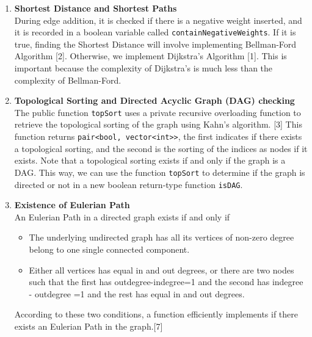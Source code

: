 \documentclass[a4paper,12pt]{article}
\def\code#1{\texttt{#1}}
\begin{document}
\begin{enumerate}
\item \textbf{Shortest Distance and Shortest Paths
\\}During edge addition, it is checked if there is a negative weight inserted, and it is recorded in a boolean variable called \code{containNegativeWeights}. If it is true, finding the Shortest Distance will involve implementing Bellman-Ford Algorithm [2]. Otherwise, we implement Dijkstra’s Algorithm [1]. This is important because the complexity of Dijkstra’s is much less than the complexity of Bellman-Ford.
\item \textbf{Topological Sorting and Directed Acyclic Graph (DAG) checking
\\}
The public function \code{topSort} uses a private recursive overloading function to retrieve the topological sorting of the graph using Kahn’s algorithm. [3] This function returns \code{pair<bool, vector<int>>}, the first indicates if there exists a topological sorting, and the second is the sorting of the indices as nodes if it exists. Note that a topological sorting exists if and only if the graph is a DAG. This way, we can use the function \code{topSort} to determine if the graph is directed or not in a new boolean return-type function \code{isDAG}.
\item \textbf{Existence of Eulerian Path\\}
An Eulerian Path in a directed graph exists if and only if 
\begin{itemize}
    \item The underlying undirected graph has all its vertices of non-zero degree belong to one single connected component.
    \item Either all vertices has equal in and out degrees, or there are two nodes such that the first has outdegree-indegree=1 and the second has indegree - outdegree =1 and the rest has equal in and out degrees.

\end{itemize}
According to these two conditions, a function efficiently implements if there exists an Eulerian Path in the graph.[7]

\end{enumerate}
\end{document}
